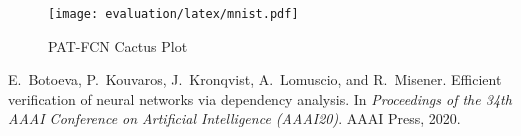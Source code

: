 \documentclass[letterpaper]{article}
\begin{document}
\begin{figure}[H]
	\centering
	\texttt{[image: evaluation/latex/mnist.pdf]}
	\caption{PAT-FCN Cactus Plot}
\end{figure}





\begin{thebibliography}{1}

E.~Botoeva, P.~Kouvaros, J.~Kronqvist, A.~Lomuscio, and R.~Misener.
\newblock Efficient verification of neural networks via dependency analysis.
\newblock In {\em Proceedings of the 34th AAAI Conference on Artificial
  Intelligence (AAAI20)}. {AAAI} Press, 2020.

\end{thebibliography}
\end{document}
